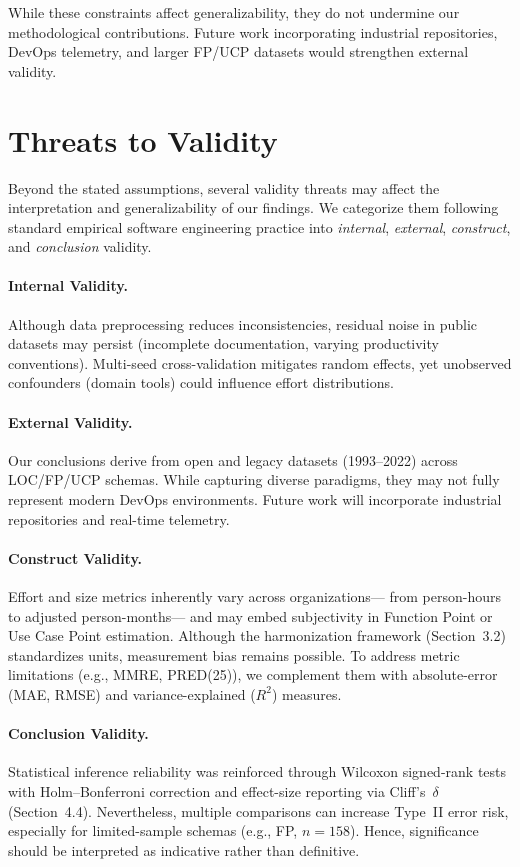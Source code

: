 \documentclass{ieeeaccess}
\begin{document}
\noindent While these constraints affect generalizability, they do not undermine our methodological contributions. Future work incorporating industrial repositories, DevOps telemetry, and larger FP/UCP datasets would strengthen external validity.

\section{Threats to Validity}
\label{sec:threats}

Beyond the stated assumptions, several validity threats may affect the interpretation and generalizability of our findings.
We categorize them following standard empirical software engineering practice 
into \textit{internal}, \textit{external}, \textit{construct}, and \textit{conclusion} validity.

\paragraph{Internal Validity.}Although data preprocessing reduces inconsistencies, residual noise in public datasets may persist (incomplete documentation, varying productivity conventions). Multi-seed cross-validation mitigates random effects, yet unobserved confounders (domain tools) could influence effort distributions.

\paragraph{External Validity.}Our conclusions derive from open and legacy datasets (1993–2022) across LOC/FP/UCP schemas. While capturing diverse paradigms, they may not fully represent modern DevOps environments. Future work will incorporate industrial repositories and real-time telemetry.

\paragraph{Construct Validity.}
Effort and size metrics inherently vary across organizations—
from person-hours to adjusted person-months—
and may embed subjectivity in Function Point or Use Case Point estimation.  
Although the harmonization framework (Section~3.2) standardizes units, 
measurement bias remains possible.
To address metric limitations (e.g., MMRE, PRED(25)),
we complement them with absolute-error (MAE, RMSE) 
and variance-explained ($R^2$) measures.

\paragraph{Conclusion Validity.}
Statistical inference reliability was reinforced through 
Wilcoxon signed-rank tests with Holm–Bonferroni correction 
and effect-size reporting via Cliff’s~$\delta$ (Section~4.4).  
Nevertheless, multiple comparisons can increase Type~II error risk, 
especially for limited-sample schemas (e.g., FP, $n{=}158$).  
Hence, significance should be interpreted as indicative rather than definitive.
\end{document}
